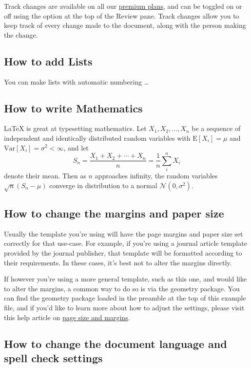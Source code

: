 \documentclass{article}
\begin{document}
Track changes are available on all our \href{https://www.overleaf.com/user/subscription/plans}{premium plans}, and can be toggled on or off using the option at the top of the Review pane. Track changes allow you to keep track of every change made to the document, along with the person making the change. 

\subsection{How to add Lists}

You can make lists with automatic numbering \dots



\subsection{How to write Mathematics}

\LaTeX{} is great at typesetting mathematics. Let $X_1, X_2, \ldots, X_n$ be a sequence of independent and identically distributed random variables with $\text{E}[X_i] = \mu$ and $\text{Var}[X_i] = \sigma^2 < \infty$, and let
\[S_n = \frac{X_1 + X_2 + \cdots + X_n}{n}
      = \frac{1}{n}\sum_{i}^{n} X_i\]
denote their mean. Then as $n$ approaches infinity, the random variables $\sqrt{n}(S_n - \mu)$ converge in distribution to a normal $\mathcal{N}(0, \sigma^2)$.


\subsection{How to change the margins and paper size}

Usually the template you're using will have the page margins and paper size set correctly for that use-case. For example, if you're using a journal article template provided by the journal publisher, that template will be formatted according to their requirements. In these cases, it's best not to alter the margins directly.

If however you're using a more general template, such as this one, and would like to alter the margins, a common way to do so is via the geometry package. You can find the geometry package loaded in the preamble at the top of this example file, and if you'd like to learn more about how to adjust the settings, please visit this help article on \href{https://www.overleaf.com/learn/latex/page_size_and_margins}{page size and margins}.

\subsection{How to change the document language and spell check settings}
\end{document}
